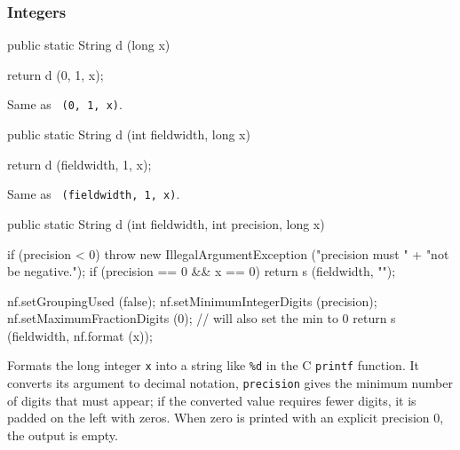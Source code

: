 \subsubsection*{Integers}
\begin{code}

   public static String d (long x)\begin{hide} {
        return d (0, 1, x);
   }\end{hide}
\end{code}
\begin{tabb}   Same as ~\texttt{(0, 1, x)}.
\end{tabb}
\begin{htmlonly}
\end{htmlonly}
\begin{code}

   public static String d (int fieldwidth, long x)\begin{hide} {
        return d (fieldwidth, 1, x);
   }\end{hide}
\end{code}
\begin{tabb}   Same as ~\texttt{(fieldwidth, 1, x)}.
\end{tabb}
\begin{htmlonly}
\end{htmlonly}
\begin{code}

   public static String d (int fieldwidth, int precision, long x)\begin{hide} {
        if (precision < 0)
            throw new IllegalArgumentException ("precision must " +
                                               "not be negative.");
        if (precision == 0 && x == 0)
            return s (fieldwidth, "");

        nf.setGroupingUsed (false);
        nf.setMinimumIntegerDigits (precision);
        nf.setMaximumFractionDigits (0); // will also set the min to 0
        return s (fieldwidth, nf.format (x));
   }\end{hide}
\end{code}
\begin{tabb} Formats the long integer \texttt{x} into a string like \texttt{\%d}
in the C \texttt{printf} function.  It converts its argument to decimal
notation, \texttt{precision} gives the minimum
number of digits that must appear; if the converted
value  requires  fewer  digits, it is padded on the
left with zeros.  When
zero is printed with an explicit precision 0, the
output is empty.
%
\end{tabb}
